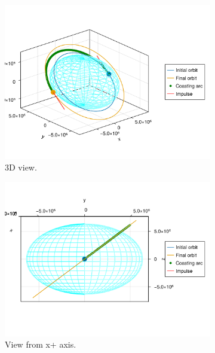 \begin{figure}[htbp]
    \centering
    \begin{subfigure}{0.49\linewidth}
        \includegraphics[width=\linewidth]{../results/two_body/hohmann/ICI_3d.png}
        \caption{3D view.}
    \end{subfigure}
    \begin{subfigure}{0.49\linewidth}
        \includegraphics[width=\linewidth]{../results/two_body/hohmann/ICI_x+.png}
        \caption{View from x+ axis.}
    \end{subfigure}
    \begin{subfigure}{0.49\linewidth}

\end{subfigure}
\end{figure}
